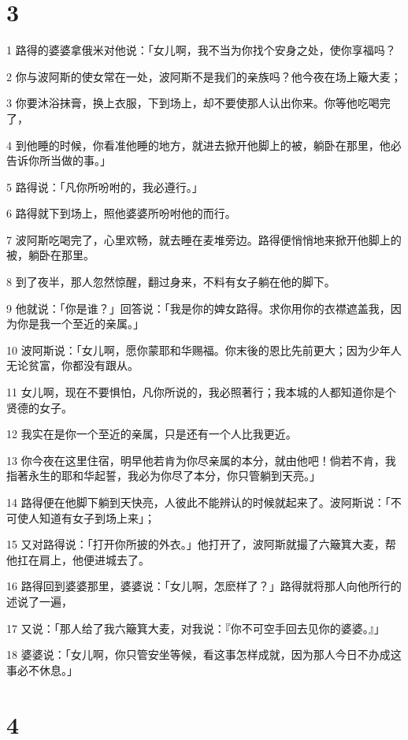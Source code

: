 \chapter{3}

\par 1 路得的婆婆拿俄米对他说：「女儿啊，我不当为你找个安身之处，使你享福吗？
\par 2 你与波阿斯的使女常在一处，波阿斯不是我们的亲族吗？他今夜在场上簸大麦；
\par 3 你要沐浴抹膏，换上衣服，下到场上，却不要使那人认出你来。你等他吃喝完了，
\par 4 到他睡的时候，你看准他睡的地方，就进去掀开他脚上的被，躺卧在那里，他必告诉你所当做的事。」
\par 5 路得说：「凡你所吩咐的，我必遵行。」
\par 6 路得就下到场上，照他婆婆所吩咐他的而行。
\par 7 波阿斯吃喝完了，心里欢畅，就去睡在麦堆旁边。路得便悄悄地来掀开他脚上的被，躺卧在那里。
\par 8 到了夜半，那人忽然惊醒，翻过身来，不料有女子躺在他的脚下。
\par 9 他就说：「你是谁？」回答说：「我是你的婢女路得。求你用你的衣襟遮盖我，因为你是我一个至近的亲属。」
\par 10 波阿斯说：「女儿啊，愿你蒙耶和华赐福。你末後的恩比先前更大；因为少年人无论贫富，你都没有跟从。
\par 11 女儿啊，现在不要惧怕，凡你所说的，我必照著行；我本城的人都知道你是个贤德的女子。
\par 12 我实在是你一个至近的亲属，只是还有一个人比我更近。
\par 13 你今夜在这里住宿，明早他若肯为你尽亲属的本分，就由他吧！倘若不肯，我指著永生的耶和华起誓，我必为你尽了本分，你只管躺到天亮。」
\par 14 路得便在他脚下躺到天快亮，人彼此不能辨认的时候就起来了。波阿斯说：「不可使人知道有女子到场上来」；
\par 15 又对路得说：「打开你所披的外衣。」他打开了，波阿斯就撮了六簸箕大麦，帮他扛在肩上，他便进城去了。
\par 16 路得回到婆婆那里，婆婆说：「女儿啊，怎麽样了？」路得就将那人向他所行的述说了一遍，
\par 17 又说：「那人给了我六簸箕大麦，对我说：『你不可空手回去见你的婆婆。』」
\par 18 婆婆说：「女儿啊，你只管安坐等候，看这事怎样成就，因为那人今日不办成这事必不休息。」

\chapter{4}

